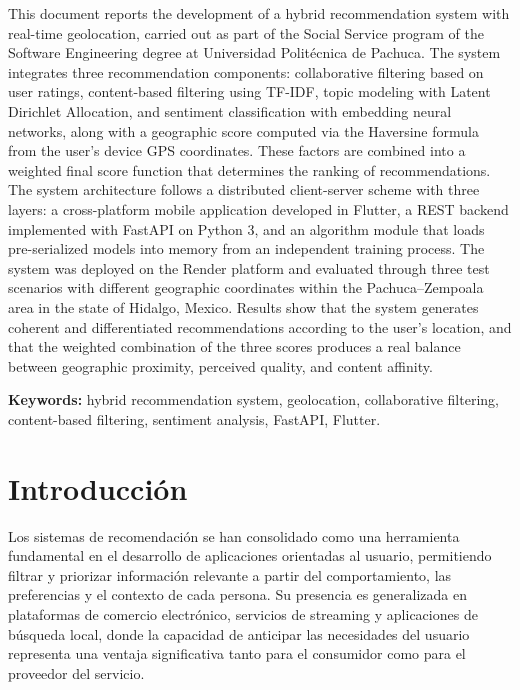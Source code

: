 \documentclass[11pt, letterpaper]{article}
\begin{document}
	This document reports the development of a hybrid recommendation system with
	real-time geolocation, carried out as part of the Social Service program of
	the Software Engineering degree at Universidad Politécnica de Pachuca. The
	system integrates three recommendation components: collaborative filtering
	based on user ratings, content-based filtering using TF-IDF, topic modeling
	with Latent Dirichlet Allocation, and sentiment classification with embedding
	neural networks, along with a geographic score computed via the Haversine
	formula from the user's device GPS coordinates. These factors are combined
	into a weighted final score function that determines the ranking of
	recommendations. The system architecture follows a distributed client-server
	scheme with three layers: a cross-platform mobile application developed in
	Flutter, a REST backend implemented with FastAPI on Python 3, and an algorithm
	module that loads pre-serialized models into memory from an independent
	training process. The system was deployed on the Render platform and evaluated
	through three test scenarios with different geographic coordinates within the
	Pachuca--Zempoala area in the state of Hidalgo, Mexico. Results show that the
	system generates coherent and differentiated recommendations according to the
	user's location, and that the weighted combination of the three scores produces
	a real balance between geographic proximity, perceived quality, and content
	affinity.
	
	\textbf{Keywords:} hybrid recommendation system, geolocation, collaborative
	filtering, content-based filtering, sentiment analysis, FastAPI, Flutter.
	
	\newpage
	\section{Introducción}
	
	Los sistemas de recomendación se han consolidado como una herramienta
	fundamental en el desarrollo de aplicaciones orientadas al usuario,
	permitiendo filtrar y priorizar información relevante a partir del
	comportamiento, las preferencias y el contexto de cada persona. Su
	presencia es generalizada en plataformas de comercio electrónico,
	servicios de streaming y aplicaciones de búsqueda local, donde la
	capacidad de anticipar las necesidades del usuario representa una
	ventaja significativa tanto para el consumidor como para el proveedor
	del servicio.
	
\end{document}
